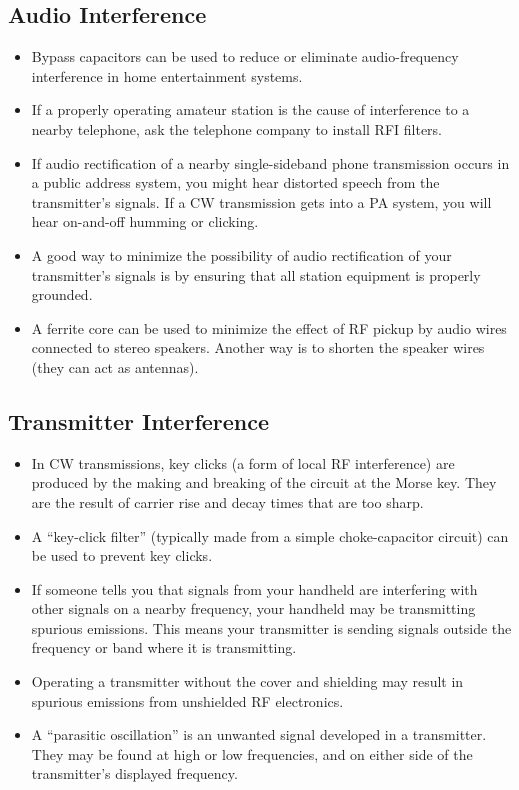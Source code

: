 \documentclass[letterpaper,12pt]{scrartcl}
\begin{document}
\subsection{Audio Interference}

\begin{itemize}
\item Bypass capacitors can be used to reduce or eliminate audio-frequency interference in home entertainment systems.
\item If a properly operating amateur station is the cause of interference to a nearby telephone, ask the telephone company to install RFI filters.
\item If audio rectification of a nearby single-sideband phone transmission occurs in a public address system, you might hear distorted speech from the transmitter's signals.
If a CW transmission gets into a PA system, you will hear on-and-off humming or clicking.
\item A good way to minimize the possibility of audio rectification of your transmitter's signals is by ensuring that all station equipment is properly grounded.
\item A ferrite core can be used to minimize the effect of RF pickup by audio wires connected to stereo speakers. Another way is to shorten the speaker wires (they can act as antennas).
\end{itemize}

\subsection{Transmitter Interference}

\begin{itemize}
\item In CW transmissions, key clicks (a form of local RF interference) are produced by the making and breaking of the circuit at the Morse key.
They are the result of carrier rise and decay times that are too sharp.
\item A ``key-click filter'' (typically made from a simple choke-capacitor circuit) can be used to prevent key clicks.
\item If someone tells you that signals from your handheld are interfering with other signals on a nearby frequency, your handheld may be transmitting spurious emissions.
This means your transmitter is sending signals outside the frequency or band where it is transmitting.
\item Operating a transmitter without the cover and shielding may result in spurious emissions from unshielded RF electronics.
\item A ``parasitic oscillation'' is an unwanted signal developed in a transmitter. They may be found at high or low frequencies, and on either side of the transmitter's displayed frequency.
\end{itemize}
\end{document}
